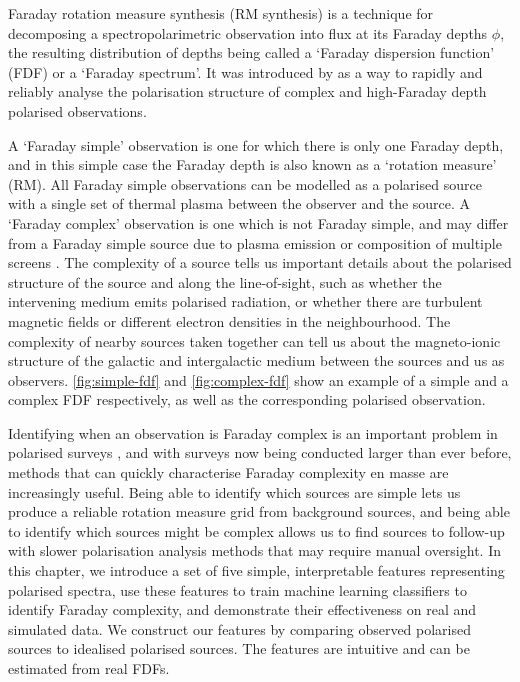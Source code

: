   Faraday rotation measure synthesis (RM synthesis) is a technique for decomposing a spectropolarimetric observation into flux at its Faraday depths $\phi$, the resulting distribution of depths being called a `Faraday dispersion function' (FDF) or a `Faraday spectrum'. It was introduced by \citet{brentjens_faraday_2005} as a way to rapidly and reliably analyse the polarisation structure of complex and high-Faraday depth polarised observations.

  A `Faraday simple' observation is one for which there is only one Faraday depth, and in this simple case the Faraday depth is also known as a `rotation measure' (RM). All Faraday simple observations can be modelled as a polarised source with a single set of thermal plasma \citep[a `Faraday screen';][]{brentjens_faraday_2005,anderson_broadband_2015} between the observer and the source. A `Faraday complex' observation is one which is not Faraday simple, and may differ from a Faraday simple source due to plasma emission or composition of multiple screens \citep{brentjens_faraday_2005}. The complexity of a source tells us important details about the polarised structure of the source and along the line-of-sight, such as whether the intervening medium emits polarised radiation, or whether there are turbulent magnetic fields or different electron densities in the neighbourhood. The complexity of nearby sources taken together can tell us about the magneto-ionic structure of the galactic and intergalactic medium between the sources and us as observers. \autoref{fig:simple-fdf} and \autoref{fig:complex-fdf} show an example of a simple and a complex FDF respectively, as well as the corresponding polarised observation.

  Identifying when an observation is Faraday complex is an important problem in polarised surveys \citep{sun15comparison}, and with surveys now being conducted larger than ever before, methods that can quickly characterise Faraday complexity en masse are increasingly useful. Being able to identify which sources are simple lets us produce a reliable rotation measure grid from background sources, and being able to identify which sources might be complex allows us to find sources to follow-up with slower polarisation analysis methods that may require manual oversight. In this chapter, we introduce a set of five simple, interpretable features representing polarised spectra, use these features to train machine learning classifiers to identify Faraday complexity, and demonstrate their effectiveness on real and simulated data. We construct our features by comparing observed polarised sources to idealised polarised sources. The features are intuitive and can be estimated from real FDFs.

